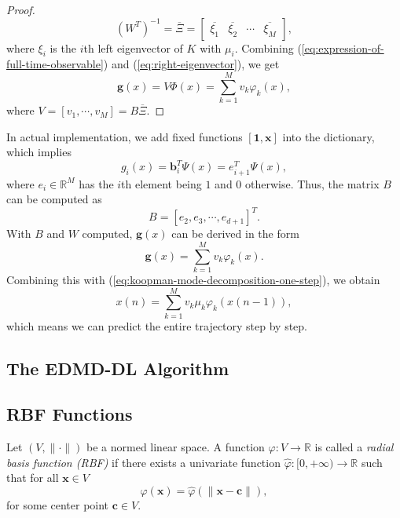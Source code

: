 \begin{proof}
\begin{equation}
    \label{eq:right-eigenvector}
    (W^T)^{-1} = \overline{\Xi}
    = \left[
      \begin{array}{cccc}
        \overline{\xi_1}&\overline{\xi_2}&\cdots&\overline{\xi_M}
      \end{array}
    \right],
  \end{equation}
  where $\xi_i$ is the $i$th left eigenvector of $K$ with $\mu_i$.
  Combining (\ref{eq:expression-of-full-time-observable})
  and (\ref{eq:right-eigenvector}),
  we get
  \begin{equation}
    \label{eq:expression-of-g}
    \mathbf{g}(x) = V \Phi(x) = \sum\limits_{k = 1}^M v_k \varphi_k(x),
  \end{equation}
  where $V = [v_1,\cdots,v_M] = B\overline{\Xi} $.
\end{proof}

In actual implementation,
we add fixed functions
$[\mathbf{1}, \mathbf{x}]$ into the dictionary,
which implies
\begin{equation*}
g_i(x) = \mathbf{b}_i^T \Psi(x) = e_{i+1}^T \Psi(x),
\end{equation*}
where $e_i \in \mathbb{R}^M$ has the $i$th element being $1$
and $0$ otherwise.
Thus, the matrix $B$ can be computed as
\begin{equation*}
  B = [e_2, e_3, \cdots, e_{d+1}]^T.
\end{equation*}
With $B$ and $W$ computed, $\mathbf{g}(x)$ can be derived in the form
\begin{equation*}
  \mathbf{g}(x) = \sum\limits_{k = 1}^M v_k\varphi_k(x).
\end{equation*}
Combining this with (\ref{eq:koopman-mode-decomposition-one-step}), we obtain
\begin{equation*}
  x(n) = \sum\limits_{k = 1}^M v_k \mu_k \varphi_k(x(n-1)),
\end{equation*}
which means we can predict the entire trajectory step by step.

\subsection{The EDMD-DL Algorithm}

\subsection{RBF Functions}

\begin{definition}
  Let $(V, \|\cdot\|)$ be a normed linear space.
  A function $\varphi: V \rightarrow \mathbb{R}$ is called
  a \emph{radial basis function (RBF)} if
  there exists a univariate function $\hat{\varphi}: [0, +\infty) \rightarrow \mathbb{R}$
  such that for all $\mathbf{x} \in V$
  \begin{equation*}
   \varphi(\mathbf{x}) = \hat{\varphi}(\|\mathbf{x} - \mathbf{c}\|),
  \end{equation*}
  for some center point $\mathbf{c} \in V$.
\end{definition}

